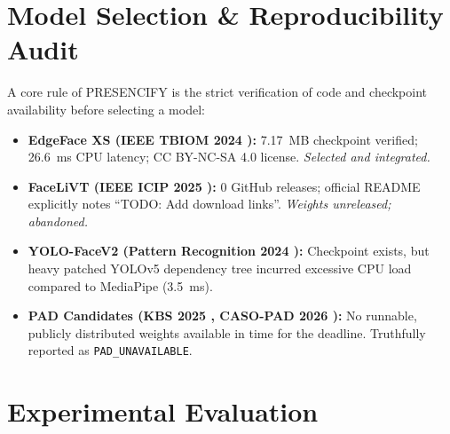 \documentclass[conference]{IEEEtran}
\begin{document}
\section{Model Selection \& Reproducibility Audit}
\label{sec:audit}
A core rule of PRESENCIFY is the strict verification of code and checkpoint availability before selecting a model:
\begin{itemize}
    \item \textbf{EdgeFace XS (IEEE TBIOM 2024 \cite{george2024edgeface}):} 7.17~MB checkpoint verified; 26.6~ms CPU latency; CC BY-NC-SA 4.0 license. \textit{Selected and integrated.}
    \item \textbf{FaceLiVT (IEEE ICIP 2025 \cite{setyawan2025facelivt}):} 0 GitHub releases; official README explicitly notes ``TODO: Add download links''. \textit{Weights unreleased; abandoned.}
    \item \textbf{YOLO-FaceV2 (Pattern Recognition 2024 \cite{yu2024yolofacev2}):} Checkpoint exists, but heavy patched YOLOv5 dependency tree incurred excessive CPU load compared to MediaPipe (3.5~ms).
    \item \textbf{PAD Candidates (KBS 2025 \cite{khan2025spatiotemporal}, CASO-PAD 2026 \cite{khan2026casopad}):} No runnable, publicly distributed weights available in time for the deadline. Truthfully reported as \texttt{PAD\_UNAVAILABLE}.
\end{itemize}

\section{Experimental Evaluation}
\end{document}
